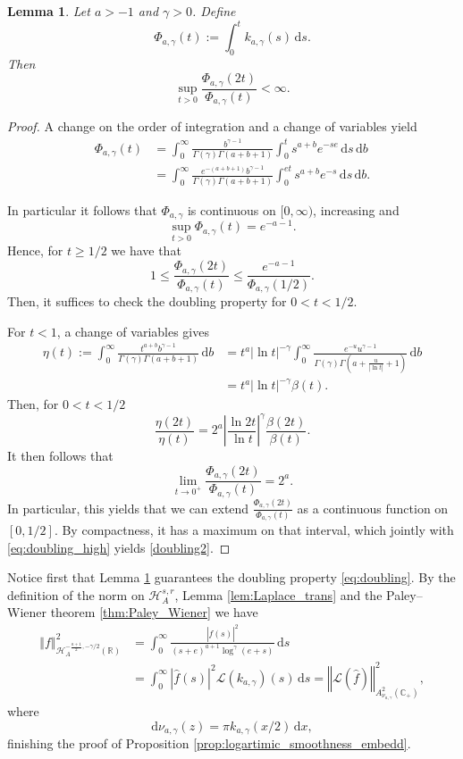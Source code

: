 \documentclass[a4paper, leqno, 10pt]{amsart}
\numberwithin{equation}{section}
\newtheorem{lemma}[thm]{Lemma}
\newcommand{\dd}{\mathrm{d}}
\newcommand{\R}{\mathbb{R}}
\newcommand{\norm}[1]{\left\Vert#1\right\Vert}
\newcommand{\abs}[1]{\left|#1\right|}
\newcommand{\C}{\mathbb{C}}
\begin{document}
\begin{lemma}\label{lem:doubling} Let $a>-1$ and $\gamma>0$. Define 
\[
\Phi_{a,\gamma}(t):=\int_0^t k_{a,\gamma}(s) \, \dd s.
\]
Then 
\begin{equation}\label{doubling2}
    \sup_{t>0} \frac{\Phi_{a,\gamma}(2t)}{\Phi_{a,\gamma}(t)}<\infty.  
\end{equation}
\end{lemma}
\begin{proof} 
A change on the order of integration and a change of variables yield
\begin{align*}
\Phi_{a,\gamma}(t)& =\int_0^\infty \frac{b^{\gamma-1}}{\Gamma(\gamma)\Gamma(a+b+1)} \int_0^t s^{a+b} e^{-se} \,  \dd s \,  \dd b\\
&=\int_0^\infty \frac{e^{-(a+b+1)}b^{\gamma-1}}{\Gamma(\gamma)\Gamma(a+b+1)} \int_0^{et} s^{a+b} e^{-s} \,  \dd s \,  \dd b. 
\end{align*}

In particular it follows that $\Phi_{a,\gamma}$ is continuous on $[0,\infty)$, increasing and
\[
\sup_{t>0}\Phi_{a,\gamma}(t)=e^{-a-1}. 
\] 
Hence, for $t\geq 1/2$ we have that
\begin{equation}\label{eq:doubling_high}
1\leq\frac{\Phi_{a,\gamma}(2t)}{\Phi_{a,\gamma}(t)}\leq \frac{e^{-a-1}}{\Phi_{a,\gamma}(1/2)}.
\end{equation}
Then, it suffices to check the doubling property for $0<t<1/2$.
	
For $t<1$, a change of variables gives
\begin{align*}
\eta(t):=\int_0^\infty \frac{t^{a+b}b^{\gamma-1}}{\Gamma(\gamma)\Gamma(a+b+1)} \, \dd b & =t^{a}\abs{\ln t}^{-\gamma}\int_0^\infty \frac{e^{-u}u^{\gamma-1}}{\Gamma(\gamma)\Gamma(a+\frac{u}{\abs{\ln t}}+1)} \, \dd b \\
 & = t^{a}\abs{\ln t}^{-\gamma} \beta(t).
\end{align*}
Then, for $0<t<1/2$  
\[
\frac{\eta(2t)}{\eta(t)}=2^{a}\abs{\frac{\ln 2t}{\ln t}}^\gamma \frac{\beta(2t)}{\beta(t)}.
\]
It then follows that 
\[
\lim_{t\to 0^+}	\frac{\Phi_{a,\gamma}(2t)}{\Phi_{a,\gamma}(t)}=2^a.
\]
In particular, this yields that we can extend $\frac{\Phi_{a,\gamma}(2t)}{\Phi_{a,\gamma}(t)}$ as a continuous function on $[0,1/2]$. By compactness, it has a maximum on that interval, which jointly with \eqref{eq:doubling_high} yields \eqref{doubling2}.
\end{proof}

Notice first that Lemma \ref{lem:doubling} guarantees the doubling property \eqref{eq:doubling}. By the definition of the norm on $\mathcal{H}^{s,r}_A$, Lemma \ref{lem:Laplace_trans} and the Paley--Wiener theorem \ref{thm:Paley_Wiener} we have
\[
\begin{split}
\norm{f}_{\mathcal{H}_A^{-\frac{a+1}{2},-\gamma/2}(\R)}^2 &=\int_{0}^\infty \frac{\abs{\widehat{f}(s)}^2}{(s+e)^{a+1}\log^\gamma (e+s)} \,  \dd s\\
&=\int_{0}^\infty {\abs{\widehat{f}(s)}^2}\mathcal{L}(k_{a,\gamma})(s) \,  \dd s=\norm{\mathcal{L}(\widehat{f})}_{A^2_{\nu_{a,\gamma}}(\C_+)}^2,
\end{split}
\]
where 
\[
\dd\nu_{a,\gamma}(z)=\pi k_{a,\gamma}(x/2) \,  \dd x,
\]
finishing the proof of Proposition \ref{prop:logartimic_smoothness_embedd}.
\end{document}
